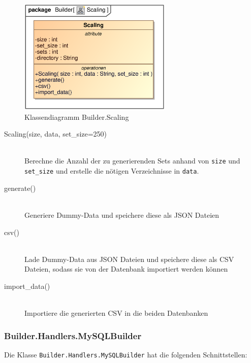 \begin{figure}[H]
    \myfloatalign
    \includegraphics[width=0.65\textwidth]{gfx/MtGDeepAnalysis/Scaling.eps}
    \caption{Klassendiagramm Builder.Scaling}
    \label{fig:class:builder.Scaling}
\end{figure}

\begin{description}
    \item[Scaling(size, data, set\_size=250)] \hfill \\
    Berechne die Anzahl der zu generierenden Sets anhand von \verb|size| und \verb|set_size| und erstelle die nötigen Verzeichnisse in \verb|data|.
    
    \item[generate()] \hfill \\
    Generiere Dummy-Data und speichere diese als \ac{JSON} Dateien
    
    \item[csv()] \hfill \\
    Lade Dummy-Data aus \ac{JSON} Dateien und speichere diese als \ac{CSV} Dateien, sodass sie von der Datenbank importiert werden können
    
    \item[import\_data()] \hfill \\
    Importiere die generierten \ac{CSV} in die beiden Datenbanken
\end{description}


\subsubsection{Builder.Handlers.MySQLBuilder}
Die Klasse \verb|Builder.Handlers.MySQLBuilder| hat die folgenden Schnittstellen:

